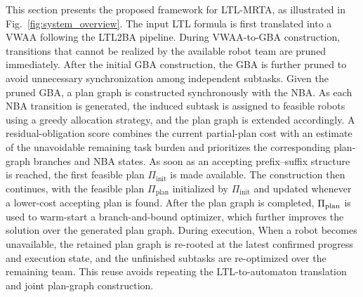 \documentclass[lettersize,journal]{IEEEtran}
\theoremstyle{italiclemma}
\theoremstyle{italiclemma}
\theoremstyle{definition}
\begin{document}
This section presents the proposed framework for LTL-MRTA, as illustrated in Fig.~\ref{fig:system_overview}. 
The input LTL formula is first translated into a VWAA following the LTL2BA pipeline. During VWAA-to-GBA construction, transitions that cannot be realized by the available robot team are pruned immediately. After the initial GBA construction, the GBA is further pruned to avoid unnecessary synchronization among independent subtasks. Given the pruned GBA, a plan graph is constructed synchronously with the NBA. As each NBA transition is generated, the induced subtask is assigned to feasible robots using a greedy allocation strategy, and the plan graph is extended accordingly.  A residual-obligation score combines the current partial-plan
cost with an estimate of the unavoidable remaining task burden and prioritizes the corresponding plan-graph branches and NBA states. As soon as an accepting prefix--suffix structure is reached, the first feasible plan $\Pi_{\mathrm{init}}$ is made available. The construction then continues, with the feasible plan $\Pi_{\mathrm{plan}}$ initialized by $\Pi_{\mathrm{init}}$ and updated whenever a lower-cost accepting plan is found.
After the plan graph is completed, $\Pi_{\rm plan}$ is used to warm-start a branch-and-bound optimizer, which further improves the solution over the generated plan graph. During execution, When a robot becomes unavailable, the retained plan graph is re-rooted at the latest confirmed progress and execution state, and the unfinished subtasks are re-optimized over the remaining team. This reuse avoids repeating the LTL-to-automaton translation and joint plan-graph construction.



\end{document}
